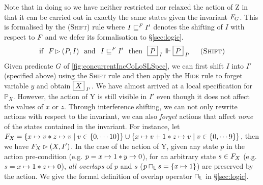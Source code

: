 %
Note that in doing so we have neither restricted nor relaxed the action of \textsf{Z} in that it can be carried out in exactly the same states given the invariant $F_{G}$. This is formalised by the \textsc{(Shift)} rule where $I \sqsubseteq^{F_{}} I'$ denotes the shifting of $I$ with respect to $F_{}$ and we defer its formalisation to \S\ref{sec:logic}.
%
\[
	\text{if}\hspace*{0.25cm} F_{} \rhd (P, I) 
	\hspace*{0.25cm}\text{and}\hspace*{0.25cm} I \sqsubseteq^{F_{}} I'
	\hspace*{0.25cm}\text{then}\hspace*{0.25cm}
	\boxed{P}_{\; I} \Vvdash \boxed{P}_{\; I'} \hspace*{0.5cm} \textsc{(Shift)}
\]
%
Given predicate $G$ of \fig\ref{fig:concurrentIncCoLoSLSpec}, we can first shift $I$ into $I'$ (specified above) using the \textsc{Shift} rule and then apply the \textsc{Hide} rule to forget variable $y$ and obtain $\boxed{X}_{\; I'}$.
We have almost arrived at a local specification for $\mathbb{P}_X$. However, the action of \textsf{Y} is still visible in $I'$ even though it does not affect the values of $x$ or $z$. Through interference shifting, we can not only rewrite actions with respect to the invariant, we can also \emph{forget} actions that affect \emph{none} of the states contained in the invariant. For instance, let $F_{X} = \left\{x \mapsto v * z \mapsto v \;|\; v \in \{0, \cdots 10\} \right\} \cup \left\{x \mapsto v+1 * z \mapsto v \;|\; v \in \{0, \cdots 9 \} \right\}$, then we have $F_{X} \rhd (X, I')$. In the case of the action of \textsf{Y}, given any state $p$ in the action pre-condition (e.g. $p = x \mapsto 1 * y \mapsto 0$), for an arbitrary state $s \in F_{X}$ (e.g. $s = x \mapsto 1 * z \mapsto 0$), \emph{all overlaps} of $p$ and $s$ ($p \sqcap_{\textsf{L}} s = \{x \mapsto 1\}$) are preserved by the action. We give the formal definition of overlap operator $\sqcap_{\textsf{L}}$ in \S\ref{sec:logic}. 
%
%
